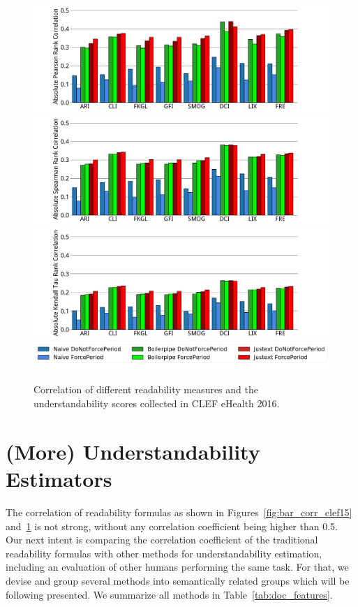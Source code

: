 \begin{figure}[th!]
   \centering
    \includegraphics[width=1.\textwidth]{graphics/bar_corr_pearson16_values}
    \includegraphics[width=1.\textwidth]{graphics/bar_corr_spearman16_values}
    \includegraphics[width=1.\textwidth]{graphics/bar_corr_kendalltau16_values}
    \includegraphics[width=1\textwidth]{graphics/legend62}
    \caption{Correlation of different readability measures and the understandability scores collected in CLEF eHealth 2016.}
   \label{fig:bar_corr_clef16}
\end{figure}


\section{(More) Understandability Estimators}
\label{sec:proxies}

The correlation of readability formulas as shown in Figures~\ref{fig:bar_corr_clef15} and~\ref{fig:bar_corr_clef16} is not strong, without any correlation coefficient being higher than 0.5.
Our next intent is comparing the correlation coefficient of the traditional readability formulas with other methods for understandability estimation, including an evaluation of other humans performing the same task.
For that, we devise and group several methods into semantically related groups which will be following presented.
We summarize all methods in Table~\ref{tab:doc_features}.

